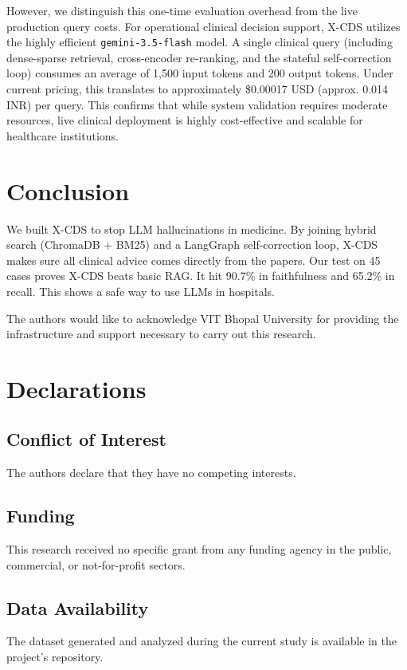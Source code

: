 \documentclass[pdflatex,sn-mathphys-num]{sn-jnl}%
\theoremstyle{thmstyleone}%
\theoremstyle{thmstyletwo}%
\theoremstyle{thmstylethree}%
\begin{document}
However, we distinguish this one-time evaluation overhead from the live production query costs. For operational clinical decision support, X-CDS utilizes the highly efficient \texttt{gemini-3.5-flash} model. A single clinical query (including dense-sparse retrieval, cross-encoder re-ranking, and the stateful self-correction loop) consumes an average of 1,500 input tokens and 200 output tokens. Under current pricing, this translates to approximately \$0.00017 USD (approx. 0.014 INR) per query. This confirms that while system validation requires moderate resources, live clinical deployment is highly cost-effective and scalable for healthcare institutions.

\section{Conclusion}\label{sec:conclusion}
We built X-CDS to stop LLM hallucinations in medicine. By joining hybrid search (ChromaDB + BM25) and a LangGraph self-correction loop, X-CDS makes sure all clinical advice comes directly from the papers. Our test on 45 cases proves X-CDS beats basic RAG. It hit 90.7\% in faithfulness and 65.2\% in recall. This shows a safe way to use LLMs in hospitals.

\backmatter

The authors would like to acknowledge VIT Bhopal University for providing the infrastructure and support necessary to carry out this research.

\section*{Declarations}

\subsection*{Conflict of Interest}
The authors declare that they have no competing interests.

\subsection*{Funding}
This research received no specific grant from any funding agency in the public, commercial, or not-for-profit sectors.

\subsection*{Data Availability}
The dataset generated and analyzed during the current study is available in the project's repository.
\end{document}
